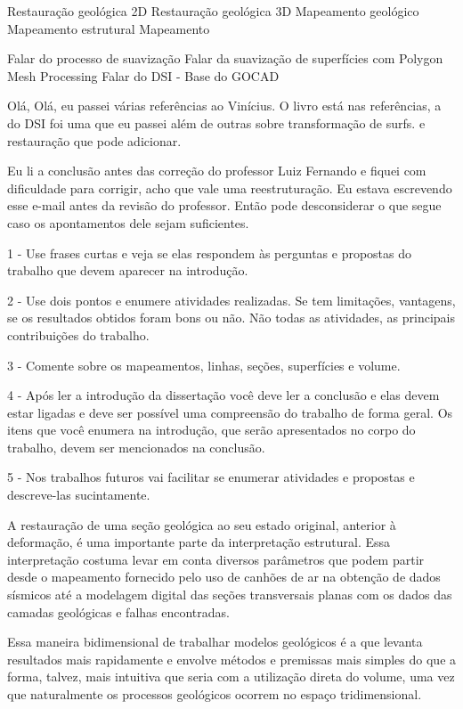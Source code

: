Restauração geológica 2D
Restauração geológica 3D
Mapeamento geológico
Mapeamento estrutural
Mapeamento 


Falar do processo de suavização
    Falar da suavização de superfícies com Polygon Mesh Processing
    Falar do DSI - Base do GOCAD

Olá,
Olá,
eu passei várias referências ao Vinícius. O livro está nas referências, a do DSI foi uma que eu passei além de outras sobre transformação de surfs. e restauração que pode adicionar.

Eu li a conclusão antes das correção do professor Luiz Fernando e fiquei com dificuldade para corrigir, acho que vale uma reestruturação.
Eu estava escrevendo esse e-mail antes da revisão do professor. Então pode desconsiderar o que segue caso os apontamentos dele sejam suficientes.

1 - Use frases curtas e veja se elas respondem às perguntas e propostas do trabalho que devem aparecer na introdução.

2 - Use dois pontos e enumere atividades realizadas. Se tem limitações, vantagens, se os resultados obtidos foram bons ou não. Não todas as atividades, as principais contribuições do trabalho.

3 - Comente sobre os mapeamentos, linhas, seções, superfícies e volume.

4 - Após ler a introdução da dissertação você deve ler a conclusão e elas devem estar ligadas e deve ser possível uma compreensão do trabalho de forma geral. Os itens que você enumera na introdução, que serão apresentados no corpo do trabalho, devem ser mencionados na conclusão.

5 - Nos trabalhos futuros vai facilitar se enumerar atividades e propostas e descreve-las sucintamente.
\fi


\iffalse
A restauração de uma seção geológica ao seu estado original, anterior à deformação, é uma importante parte da interpretação estrutural.\cite{Fossen} Essa interpretação costuma levar em conta diversos parâmetros que podem partir desde o mapeamento fornecido pelo uso de canhões de ar na obtenção de dados sísmicos até a modelagem digital das seções transversais planas com os dados das camadas geológicas e falhas encontradas.

Essa maneira bidimensional de trabalhar modelos geológicos é a que levanta resultados mais rapidamente e envolve métodos e premissas mais simples do que a forma, talvez, mais intuitiva que seria com a utilização direta do volume, uma vez que naturalmente os processos geológicos ocorrem no espaço tridimensional.


